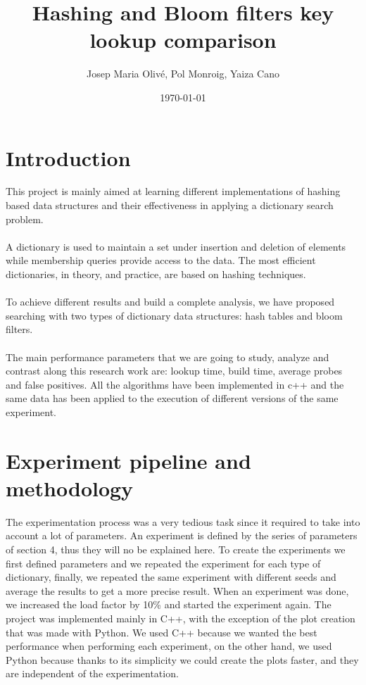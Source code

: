 \documentclass{article}
\title{Hashing and Bloom filters key lookup comparison}
\author{Josep Maria Olivé, Pol Monroig, Yaiza Cano}
\date{\today}
\begin{document}
    \maketitle
    \thispagestyle{empty}
 
    \section{Introduction}
        This project is mainly aimed at learning different implementations of hashing based data structures and their effectiveness in applying a dictionary search problem. \\\\
A dictionary is used to maintain a set under insertion and deletion of elements while membership queries provide access to the data. The most efficient dictionaries, in theory, and practice, are based on hashing techniques. \\\\
To achieve different results and build a complete analysis, we have proposed searching with two types of dictionary data structures: hash tables and bloom filters. \\\\
The main performance parameters that we are going to study, analyze and contrast along this research work are: lookup time, build time, average probes and false positives.
All the algorithms have been implemented in c++ and the same data has been applied to the execution of different versions of the same experiment. 

    \section{Experiment pipeline and methodology}
        The experimentation process was a very tedious task since it required to take into account a lot of parameters. An experiment is defined by the series of parameters of section 4, thus they will no be explained here. To create the experiments we first defined parameters and we repeated the experiment for each type of dictionary, finally, we repeated the same experiment with different seeds and average the results to get a more precise result. When an experiment was done, we increased the load factor by 10\% and started the experiment again. The project was implemented mainly in C++, with the exception of the plot creation that was made with Python. We used C++ because we wanted the best performance when performing each experiment, on the other hand, we used Python because thanks to its simplicity we could create the plots faster, and they are independent of the experimentation. 
        
\end{document}
